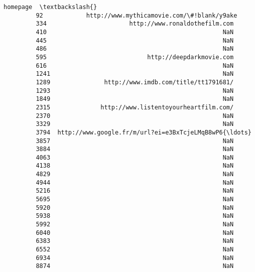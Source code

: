 \documentclass[11pt]{article}
\begin{document}
\begin{Verbatim}[commandchars=\\\{\}]
                                                        homepage  \textbackslash{}
         92            http://www.mythicamovie.com/\#!blank/y9ake   
         334                       http://www.ronaldothefilm.com   
         410                                                 NaN   
         445                                                 NaN   
         486                                                 NaN   
         595                            http://deepdarkmovie.com   
         616                                                 NaN   
         1241                                                NaN   
         1289               http://www.imdb.com/title/tt1791681/   
         1293                                                NaN   
         1849                                                NaN   
         2315              http://www.listentoyourheartfilm.com/   
         2370                                                NaN   
         3329                                                NaN   
         3794  http://www.google.fr/m/url?ei=e3BxTcjeLMqB8wP6{\ldots}   
         3857                                                NaN   
         3884                                                NaN   
         4063                                                NaN   
         4138                                                NaN   
         4829                                                NaN   
         4944                                                NaN   
         5216                                                NaN   
         5695                                                NaN   
         5920                                                NaN   
         5938                                                NaN   
         5992                                                NaN   
         6040                                                NaN   
         6383                                                NaN   
         6552                                                NaN   
         6934                                                NaN   
         8874                                                NaN   
         

\end{Verbatim}
\end{document}
